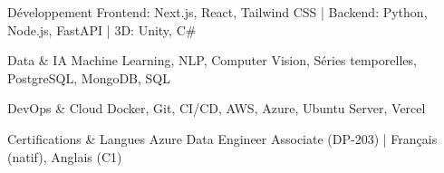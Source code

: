 


\begin{cvskills}


\cvskill
{Développement} %
{Frontend: Next.js, React, Tailwind CSS | Backend: Python, Node.js, FastAPI | 3D: Unity, C\#} %


\cvskill
{Data \& IA} %
{Machine Learning, NLP, Computer Vision, Séries temporelles, PostgreSQL, MongoDB, SQL} %


\cvskill
{DevOps \& Cloud} %
{Docker, Git, CI/CD, AWS, Azure, Ubuntu Server, Vercel} %


\cvskill
{Certifications \& Langues} %
{Azure Data Engineer Associate (DP-203) | Français (natif), Anglais (C1)} %


\end{cvskills}